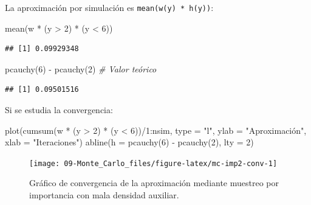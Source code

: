 \documentclass[
]{book}
\newenvironment{Shaded}{\begin{snugshade}}{\end{snugshade}}
\newcommand{\AttributeTok}[1]{\textcolor[rgb]{0.77,0.63,0.00}{#1}}
\newcommand{\CommentTok}[1]{\textcolor[rgb]{0.56,0.35,0.01}{\textit{#1}}}
\newcommand{\DecValTok}[1]{\textcolor[rgb]{0.00,0.00,0.81}{#1}}
\newcommand{\FunctionTok}[1]{\textcolor[rgb]{0.00,0.00,0.00}{#1}}
\newcommand{\NormalTok}[1]{#1}
\newcommand{\SpecialCharTok}[1]{\textcolor[rgb]{0.00,0.00,0.00}{#1}}
\newcommand{\StringTok}[1]{\textcolor[rgb]{0.31,0.60,0.02}{#1}}
\theoremstyle{break}
\theoremstyle{definition}
\theoremstyle{definition}
\theoremstyle{definition}
\theoremstyle{definition}
\theoremstyle{remark}
\begin{document}
La aproximación por simulación es \texttt{mean(w(y)\ *\ h(y))}:

\begin{Shaded}
\begin{Highlighting}[]
\FunctionTok{mean}\NormalTok{(w }\SpecialCharTok{*}\NormalTok{ (y }\SpecialCharTok{\textgreater{}} \DecValTok{2}\NormalTok{) }\SpecialCharTok{*}\NormalTok{ (y }\SpecialCharTok{\textless{}} \DecValTok{6}\NormalTok{)) }
\end{Highlighting}
\end{Shaded}

\begin{verbatim}
## [1] 0.09929348
\end{verbatim}

\begin{Shaded}
\begin{Highlighting}[]
\FunctionTok{pcauchy}\NormalTok{(}\DecValTok{6}\NormalTok{) }\SpecialCharTok{{-}} \FunctionTok{pcauchy}\NormalTok{(}\DecValTok{2}\NormalTok{)  }\CommentTok{\# Valor teórico}
\end{Highlighting}
\end{Shaded}

\begin{verbatim}
## [1] 0.09501516
\end{verbatim}

Si se estudia la convergencia:

\begin{Shaded}
\begin{Highlighting}[]
\FunctionTok{plot}\NormalTok{(}\FunctionTok{cumsum}\NormalTok{(w }\SpecialCharTok{*}\NormalTok{ (y }\SpecialCharTok{\textgreater{}} \DecValTok{2}\NormalTok{) }\SpecialCharTok{*}\NormalTok{ (y }\SpecialCharTok{\textless{}} \DecValTok{6}\NormalTok{))}\SpecialCharTok{/}\DecValTok{1}\SpecialCharTok{:}\NormalTok{nsim, }\AttributeTok{type =} \StringTok{"l"}\NormalTok{, }\AttributeTok{ylab =} \StringTok{"Aproximación"}\NormalTok{, }\AttributeTok{xlab =} \StringTok{"Iteraciones"}\NormalTok{)}
\FunctionTok{abline}\NormalTok{(}\AttributeTok{h =} \FunctionTok{pcauchy}\NormalTok{(}\DecValTok{6}\NormalTok{) }\SpecialCharTok{{-}} \FunctionTok{pcauchy}\NormalTok{(}\DecValTok{2}\NormalTok{), }\AttributeTok{lty =} \DecValTok{2}\NormalTok{)}
\end{Highlighting}
\end{Shaded}

\begin{figure}[!htb]

{\centering \texttt{[image: 09-Monte\_Carlo\_files/figure-latex/mc-imp2-conv-1]} 

}

\caption{Gráfico de convergencia de la aproximación mediante muestreo por importancia con mala densidad auxiliar.}\label{fig:mc-imp2-conv}
\end{figure}
\end{document}
